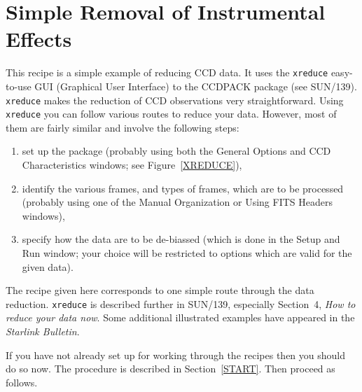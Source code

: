 \documentclass[twoside,11pt]{article}
\newcommand{\xref}[3]{#1}
\newcommand{\xlabel}[1]{}
\begin{document}
\newpage
\section{\xlabel{SIMPLE_SOLUTION}\label{SIMPLE_SOLUTION}Simple Removal of
Instrumental Effects}

This recipe is a simple example of reducing CCD data.  It uses the
{\tt xreduce} easy-to-use GUI (Graphical User Interface) to the CCDPACK
package (see \xref{SUN/139}{sun139}{}\/\cite{SUN139}).  {\tt xreduce}
makes the reduction of CCD observations very straightforward.  Using
{\tt xreduce} you can follow various routes to reduce your data.  However,
most of them are fairly similar and involve the following steps:

\begin{enumerate}

  \item set up the package (probably using both the {\sf General Options}
   and {\sf CCD Characteristics} windows; see Figure~\ref{XREDUCE}),

  \item identify the various frames, and types of frames, which are to
   be processed (probably using one of the {\sf Manual Organization} or
   {\sf Using FITS Headers} windows),

  \item specify how the data are to be de-biassed (which is done in the
   {\sf Setup and Run} window; your choice will be restricted to options
   which are valid for the given data).

\end{enumerate}

The recipe given here corresponds to one simple route through the data
reduction.
{\tt xreduce} is described further in \xref{SUN/139}{sun139}{}, especially
Section~4, {\it How to reduce your data now}.  Some additional illustrated
examples have appeared in the {\it Starlink Bulletin}\/\cite{DRAPER95}.

If you have not already set up for working through the recipes then
you should do so now.  The procedure is described in Section~\ref{START}.
Then proceed as follows.
\end{document}
